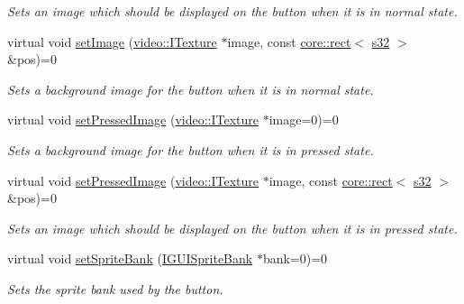 \begin{DoxyCompactItemize}
\begin{DoxyCompactList}\small\item\em Sets an image which should be displayed on the button when it is in normal state. \end{DoxyCompactList}\item 
virtual void \hyperlink{classirr_1_1gui_1_1IGUIButton_a205490ec6b4978afe9d3f6a4aed92b50}{set\+Image} (\hyperlink{classirr_1_1video_1_1ITexture}{video\+::\+I\+Texture} $\ast$image, const \hyperlink{classirr_1_1core_1_1rect}{core\+::rect}$<$ \hyperlink{namespaceirr_ac66849b7a6ed16e30ebede579f9b47c6}{s32} $>$ \&pos)=0
\begin{DoxyCompactList}\small\item\em Sets a background image for the button when it is in normal state. \end{DoxyCompactList}\item 
virtual void \hyperlink{classirr_1_1gui_1_1IGUIButton_a10389917530aa2f4a3008330c0695aad}{set\+Pressed\+Image} (\hyperlink{classirr_1_1video_1_1ITexture}{video\+::\+I\+Texture} $\ast$image=0)=0
\begin{DoxyCompactList}\small\item\em Sets a background image for the button when it is in pressed state. \end{DoxyCompactList}\item 
virtual void \hyperlink{classirr_1_1gui_1_1IGUIButton_a08019647ec3e08984d795b3c564d457e}{set\+Pressed\+Image} (\hyperlink{classirr_1_1video_1_1ITexture}{video\+::\+I\+Texture} $\ast$image, const \hyperlink{classirr_1_1core_1_1rect}{core\+::rect}$<$ \hyperlink{namespaceirr_ac66849b7a6ed16e30ebede579f9b47c6}{s32} $>$ \&pos)=0
\begin{DoxyCompactList}\small\item\em Sets an image which should be displayed on the button when it is in pressed state. \end{DoxyCompactList}\item 
\mbox{\label{classirr_1_1gui_1_1IGUIButton_a0570cc64a1445866a0c8123c0209c83d}} 
virtual void \hyperlink{classirr_1_1gui_1_1IGUIButton_a0570cc64a1445866a0c8123c0209c83d}{set\+Sprite\+Bank} (\hyperlink{classirr_1_1gui_1_1IGUISpriteBank}{I\+G\+U\+I\+Sprite\+Bank} $\ast$bank=0)=0
\begin{DoxyCompactList}\small\item\em Sets the sprite bank used by the button. \end{DoxyCompactList}\item 

\end{DoxyCompactItemize}
